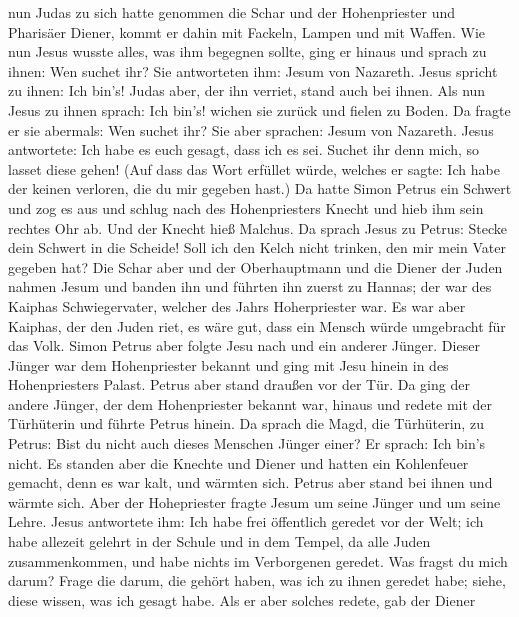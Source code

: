 nun Judas zu sich hatte genommen die Schar und der Hohenpriester und
Pharisäer Diener, kommt er dahin mit Fackeln, Lampen und mit Waffen.
 Wie nun Jesus wusste alles, was ihm begegnen sollte, ging
er hinaus und sprach zu ihnen: Wen suchet ihr?  Sie
antworteten ihm: Jesum von Nazareth. Jesus spricht zu ihnen: Ich bin's!
Judas aber, der ihn verriet, stand auch bei ihnen.  Als nun
Jesus zu ihnen sprach: Ich bin's! wichen sie zurück und fielen zu Boden.
 Da fragte er sie abermals: Wen suchet ihr? Sie aber
sprachen: Jesum von Nazareth.  Jesus antwortete: Ich habe es
euch gesagt, dass ich es sei. Suchet ihr denn mich, so lasset diese
gehen!  (Auf dass das Wort erfüllet würde, welches er sagte:
Ich habe der keinen verloren, die du mir gegeben hast.)  Da
hatte Simon Petrus ein Schwert und zog es aus und schlug nach des
Hohenpriesters Knecht und hieb ihm sein rechtes Ohr ab. Und der Knecht
hieß Malchus.  Da sprach Jesus zu Petrus: Stecke dein
Schwert in die Scheide! Soll ich den Kelch nicht trinken, den mir mein
Vater gegeben hat?  Die Schar aber und der Oberhauptmann
und die Diener der Juden nahmen Jesum und banden ihn  und
führten ihn zuerst zu Hannas; der war des Kaiphas Schwiegervater,
welcher des Jahrs Hoherpriester war.  Es war aber Kaiphas,
der den Juden riet, es wäre gut, dass ein Mensch würde umgebracht für
das Volk.  Simon Petrus aber folgte Jesu nach und ein
anderer Jünger. Dieser Jünger war dem Hohenpriester bekannt und ging mit
Jesu hinein in des Hohenpriesters Palast.  Petrus aber
stand draußen vor der Tür. Da ging der andere Jünger, der dem
Hohenpriester bekannt war, hinaus und redete mit der Türhüterin und
führte Petrus hinein.  Da sprach die Magd, die Türhüterin,
zu Petrus: Bist du nicht auch dieses Menschen Jünger einer? Er sprach:
Ich bin's nicht.  Es standen aber die Knechte und Diener
und hatten ein Kohlenfeuer gemacht, denn es war kalt, und wärmten sich.
Petrus aber stand bei ihnen und wärmte sich.  Aber der
Hohepriester fragte Jesum um seine Jünger und um seine Lehre.
 Jesus antwortete ihm: Ich habe frei öffentlich geredet vor
der Welt; ich habe allezeit gelehrt in der Schule und in dem Tempel, da
alle Juden zusammenkommen, und habe nichts im Verborgenen geredet.
 Was fragst du mich darum? Frage die darum, die gehört
haben, was ich zu ihnen geredet habe; siehe, diese wissen, was ich
gesagt habe.  Als er aber solches redete, gab der Diener
